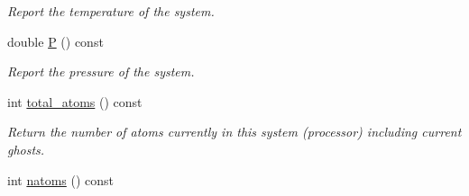 \begin{DoxyCompactItemize}
\begin{DoxyCompactList}\small\item\em Report the temperature of the system. \end{DoxyCompactList}\item 
\hypertarget{classSystem_acd7d6696787afb9b3bfa4197112802fa}{double \hyperlink{classSystem_acd7d6696787afb9b3bfa4197112802fa}{P} () const }\label{classSystem_acd7d6696787afb9b3bfa4197112802fa}

\begin{DoxyCompactList}\small\item\em Report the pressure of the system. \end{DoxyCompactList}\item 
\hypertarget{classSystem_aa1e45df46f5eed80d5ab09a882d2224f}{int \hyperlink{classSystem_aa1e45df46f5eed80d5ab09a882d2224f}{total\-\_\-atoms} () const }\label{classSystem_aa1e45df46f5eed80d5ab09a882d2224f}

\begin{DoxyCompactList}\small\item\em Return the number of atoms currently in this system (processor) including current ghosts. \end{DoxyCompactList}\item 
\hypertarget{classSystem_a92088c8b2f7416199537a7e7f3152aff}{int \hyperlink{classSystem_a92088c8b2f7416199537a7e7f3152aff}{natoms} () const }\label{classSystem_a92088c8b2f7416199537a7e7f3152aff}


\end{DoxyCompactItemize}
